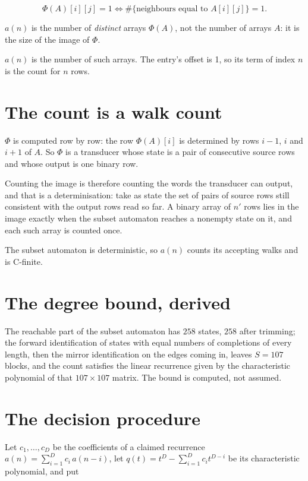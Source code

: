 \documentclass[11pt]{article}
\theoremstyle{definition}
\begin{document}
\[\Phi(A)[i][j] = 1 \iff \#\{\text{neighbours equal to } A[i][j]\} = 1.\]

$a(n)$ is the number of {\itshape distinct} arrays $\Phi(A)$, not the number of arrays $A$: it is the size of the image of $\Phi$.

$a(n)$ is the number of such arrays. The entry's offset is 1, so its term of index $n$ is the count for $n$ rows.

\section{The count is a walk count}

$\Phi$ is computed row by row: the row $\Phi(A)[i]$ is determined by rows $i-1$, $i$ and $i+1$ of $A$. So $\Phi$ is a transducer whose state is a pair of consecutive source rows and whose output is one binary row.

Counting the image is therefore counting the words the transducer can output, and that is a determinisation: take as state the set of pairs of source rows still consistent with the output rows read so far. A binary array of $n'$ rows lies in the image exactly when the subset automaton reaches a nonempty state on it, and each such array is counted once.

The subset automaton is deterministic, so $a(n)$ counts its accepting walks and is C-finite.

\section{The degree bound, derived}

The reachable part of the subset automaton has $258$ states, $258$ after trimming; the forward identification of states with equal numbers of completions of every length, then the mirror identification on the edges coming in, leaves $S = 107$ blocks, and the count satisfies the linear recurrence given by the characteristic polynomial of that $107\times107$ matrix. The bound is computed, not assumed.

\section{The decision procedure}

Let $c_1,\dots,c_D$ be the coefficients of a claimed recurrence $a(n) = \sum_{i=1}^{D} c_i\,a(n-i)$, let $q(t) = t^{D} - \sum_{i=1}^{D} c_i t^{D-i}$ be its characteristic polynomial, and put
\end{document}

